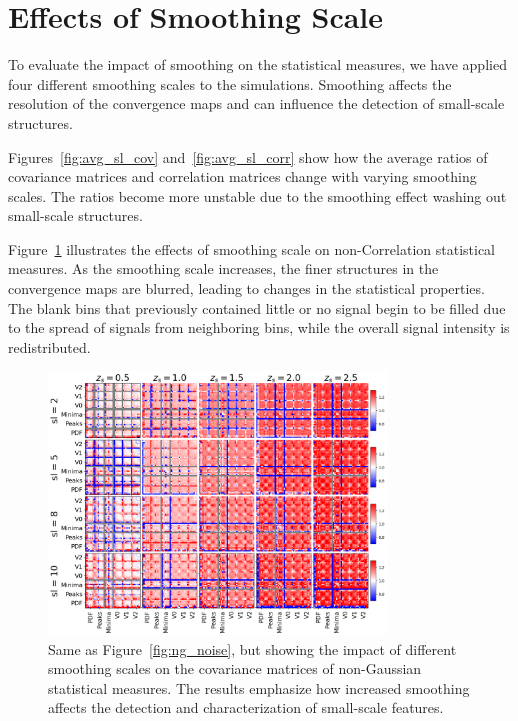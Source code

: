 \section{Effects of Smoothing Scale}
To evaluate the impact of smoothing on the statistical measures, we have applied four different smoothing scales to the simulations. Smoothing affects the resolution of the convergence maps and can influence the detection of small-scale structures.

Figures~\ref{fig:avg_sl_cov} and~\ref{fig:avg_sl_corr} show how the average ratios of covariance matrices and correlation matrices change with varying smoothing scales. The ratios become more unstable due to the smoothing effect washing out small-scale structures.

Figure~\ref{fig:ng_smoothing} illustrates the effects of smoothing scale on non-Correlation statistical measures. As the smoothing scale increases, the finer structures in the convergence maps are blurred, leading to changes in the statistical properties. The blank bins that previously contained little or no signal begin to be filled due to the spread of signals from neighboring bins, while the overall signal intensity is redistributed.

\begin{figure}[ht]
    \centering
    \includegraphics[width=0.8\textwidth]{figures/results/nongaussian_cov_sl.png}
    \caption{Same as Figure~\ref{fig:ng_noise}, but showing the impact of different smoothing scales on the covariance matrices of non-Gaussian statistical measures. The results emphasize how increased smoothing affects the detection and characterization of small-scale features.}
    \label{fig:ng_smoothing}
\end{figure}